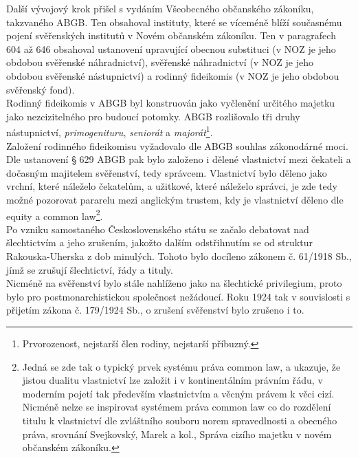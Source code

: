 \documentclass{article}
\begin{document}

Další vývojový krok přišel s vydáním Všeobecného občanského zákoníku, takzvaného ABGB. Ten obsahoval instituty, které se víceméně blíží současnému pojení svěřenských institutů v Novém občanském zákoníku. Ten v paragrafech 604 až 646 obsahoval ustanovení upravující obecnou substituci (v NOZ je jeho obdobou svěřenské náhradnictví), svěřenské náhradnictví (v NOZ je jeho obdobou svěřenské nástupnictví) a rodinný fideikomis (v NOZ je jeho obdobou svěřenský fond).\\

Rodinný fideikomis v ABGB byl konstruován jako vyčlenění určitého majetku jako nezcizitelného pro budoucí potomky. ABGB rozlišovalo tři druhy nástupnictví, \textit{primogenituru}, \textit{seniorát} a \textit{majorát}\footnote{Prvorozenost, nejstarší člen rodiny, nejstarší příbuzný.}.\\

Založení rodinného fideikomisu vyžadovalo dle ABGB souhlas zákonodárné moci. Dle ustanovení § 629 ABGB pak bylo založeno i dělené vlastnictví mezi čekateli a dočasným majitelem svěřenství, tedy správcem. Vlastnictví bylo děleno jako vrchní, které náleželo čekatelům, a užitkové, které náleželo správci, je zde tedy možné pozorovat pararelu mezi anglickým trustem, kdy je vlastnictví děleno dle equity a common law\footnote{Jedná se zde tak o typický prvek systému práva common law, a ukazuje, že jistou dualitu vlastnictví lze založit i v kontinentálním právním řádu, v moderním pojetí tak především vlastnictvím a věcným právem k věci cizí. Nicméně nelze se inspirovat systémem práva common law co do rozdělení titulu k vlastnictví dle zvláštního souboru norem spravedlnosti a obecného práva, srovnání Svejkovský, Marek a kol., Správa cizího majetku v novém občanském zákoníku.}.\\

Po vzniku samostaného Československého státu se začalo debatovat nad šlechtictvím a jeho zrušením, jakožto dalším odstřihnutím se od struktur Rakouska-Uherska z dob minulých. Tohoto bylo docíleno zákonem č. 61/1918 Sb., jímž se zrušují šlechtictví, řády a tituly.\\

Nicméně na svěřenství bylo stále nahlíženo jako na šlechtické privilegium, proto bylo pro postmonarchistickou společnost nežádoucí. Roku 1924 tak v souvislosti s přijetím zákona č. 179/1924 Sb., o zrušení svěřenství bylo zrušeno i to.\\
\end{document}
